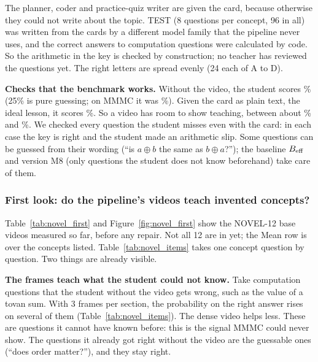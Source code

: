 \documentclass[11pt]{article}
\begin{document}
The planner, coder and practice-quiz writer are given the card, because otherwise they could not write about the
topic. TEST (8 questions per concept, 96 in all) was written from the cards by a different model family that the
pipeline never uses, and the correct answers to computation questions were calculated by code. So the arithmetic in
the key is checked by construction; no teacher has reviewed the questions yet. The right letters are spread evenly (24 each of A to D).

\textbf{Checks that the benchmark works.} Without the video, the student scores \novelpriorGemmaAcc\% (25\% is pure guessing;
on MMMC it was \mmmcpriorGemmaAcc\%). Given the card as plain text, the ideal lesson, it scores
\novelcardGemmaAcc\%. So a video has room to show teaching, between about \novelpriorGemmaAcc\% and
\novelcardGemmaAcc\%. We checked every question the student misses even with the card: in each case the key is right
and the student made an arithmetic slip. Some questions can be guessed from their wording (``is $a \oplus b$ the same
as $b \oplus a$?''); the baseline $B_{\text{eff}}$ and version M8 (only questions the student does not know beforehand) take
care of them.


\subsubsection*{First look: do the pipeline's videos teach invented concepts?}

Table~\ref{tab:novel_first} and Figure~\ref{fig:novel_first} show the NOVEL-12 base videos measured so far, before any
repair. Not all 12 are in yet; the Mean row is over the concepts listed. Table~\ref{tab:novel_items} takes one concept question by question. Two things are already visible.

\textbf{The frames teach what the student could not know.} Take computation questions that the student without the video
gets wrong, such as the value of a tovan sum. With 3 frames per section, the probability on the right answer rises on
several of them (Table~\ref{tab:novel_items}). The dense video helps less. These are questions it cannot have known before: this is the signal MMMC could never show. The
questions it already got right without the video are the guessable ones (``does order matter?''), and they stay right.
\end{document}
